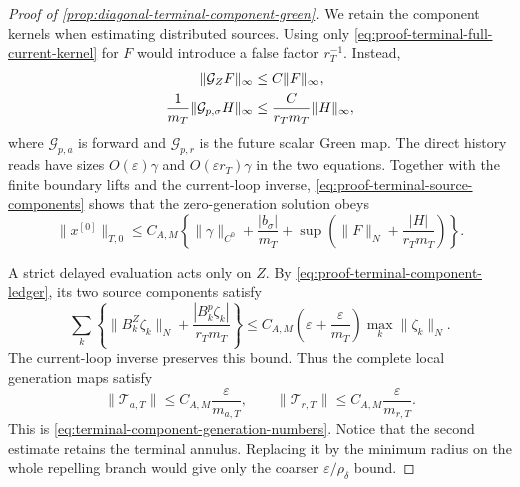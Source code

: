 \begin{proof}[Proof of
\cref{prop:diagonal-terminal-component-green}]
We retain the component kernels when estimating distributed sources.
Using only
\cref{eq:proof-terminal-full-current-kernel} for \(F\) would introduce a
false factor \(r_T^{-1}\).  Instead,
\begin{align}
 \|\mathcal G_ZF\|_\infty
 &\le C\|F\|_\infty,\notag\\
 \frac1{m_T}\|\mathcal G_{p,\sigma}H\|_\infty
 &\le\frac C{r_Tm_T}\|H\|_\infty,               \label{eq:proof-terminal-source-components}
\end{align}
where \(\mathcal G_{p,a}\) is forward and
\(\mathcal G_{p,r}\) is the future scalar Green map.  The direct history
reads have sizes \(O(\varepsilon)\gamma\) and
\(O(\varepsilon r_T)\gamma\) in the two equations.  Together with the
finite boundary lifts and the current-loop inverse,
\cref{eq:proof-terminal-source-components} shows that the zero-generation
solution obeys
\begin{equation}
 \|x^{[0]}\|_{T,0}
 \le C_{A,M}\left\{\|\gamma\|_{C^0}
       +\frac{|b_\sigma|}{m_T}
       +\sup\left(\|F\|_N+\frac{|H|}{r_Tm_T}\right)\right\}.
                                                        \label{eq:proof-terminal-zero-generation}
\end{equation}

A strict delayed evaluation acts only on \(Z\).  By
\cref{eq:proof-terminal-component-ledger}, its two source components
satisfy
\[
 \sum_k\left\{\|B_k^Z\zeta_k\|_N
       +\frac{|B_k^p\zeta_k|}{r_Tm_T}\right\}
 \le C_{A,M}\left(\varepsilon+\frac{\varepsilon}{m_T}\right)
       \max_k\|\zeta_k\|_N .
\]
The current-loop inverse preserves this bound.  Thus the complete local
generation maps satisfy
\[
 \|\mathscr T_{a,T}\|\le C_{A,M}\frac{\varepsilon}{m_{a,T}},
 \qquad
 \|\mathscr T_{r,T}\|\le C_{A,M}\frac{\varepsilon}{m_{r,T}}.
                                                        \label{eq:proof-terminal-generation}
\]
This is \cref{eq:terminal-component-generation-numbers}.  Notice that the
second estimate retains the terminal annulus.  Replacing it by the minimum
radius on the whole repelling branch would give only the coarser
\(\varepsilon/\rho_\delta\) bound.


\end{proof}

